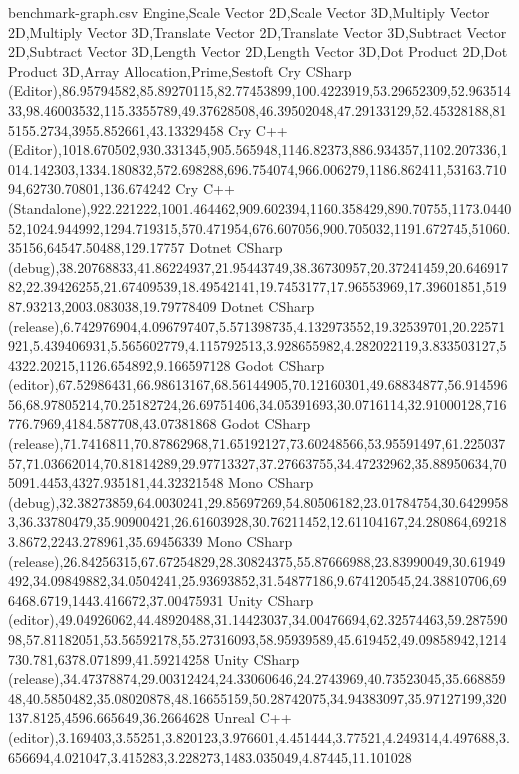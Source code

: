 \begin{filecontents*}{benchmark-graph.csv}
Engine,Scale Vector 2D,Scale Vector 3D,Multiply Vector 2D,Multiply Vector 3D,Translate Vector 2D,Translate Vector 3D,Subtract Vector 2D,Subtract Vector 3D,Length Vector 2D,Length Vector 3D,Dot Product 2D,Dot Product 3D,Array Allocation,Prime,Sestoft
Cry CSharp (Editor),86.95794582,85.89270115,82.77453899,100.4223919,53.29652309,52.96351433,98.46003532,115.3355789,49.37628508,46.39502048,47.29133129,52.45328188,815155.2734,3955.852661,43.13329458
Cry C++ (Editor),1018.670502,930.331345,905.565948,1146.82373,886.934357,1102.207336,1014.142303,1334.180832,572.698288,696.754074,966.006279,1186.862411,53163.71094,62730.70801,136.674242
Cry C++ (Standalone),922.221222,1001.464462,909.602394,1160.358429,890.70755,1173.044052,1024.944992,1294.719315,570.471954,676.607056,900.705032,1191.672745,51060.35156,64547.50488,129.17757
Dotnet CSharp (debug),38.20768833,41.86224937,21.95443749,38.36730957,20.37241459,20.64691782,22.39426255,21.67409539,18.49542141,19.7453177,17.96553969,17.39601851,51987.93213,2003.083038,19.79778409
Dotnet CSharp (release),6.742976904,4.096797407,5.571398735,4.132973552,19.32539701,20.22571921,5.439406931,5.565602779,4.115792513,3.928655982,4.282022119,3.833503127,54322.20215,1126.654892,9.166597128
Godot CSharp (editor),67.52986431,66.98613167,68.56144905,70.12160301,49.68834877,56.91459656,68.97805214,70.25182724,26.69751406,34.05391693,30.0716114,32.91000128,716776.7969,4184.587708,43.07381868
Godot CSharp (release),71.7416811,70.87862968,71.65192127,73.60248566,53.95591497,61.22503757,71.03662014,70.81814289,29.97713327,37.27663755,34.47232962,35.88950634,705091.4453,4327.935181,44.32321548
Mono CSharp (debug),32.38273859,64.0030241,29.85697269,54.80506182,23.01784754,30.64299583,36.33780479,35.90900421,26.61603928,30.76211452,12.61104167,24.280864,692183.8672,2243.278961,35.69456339
Mono CSharp (release),26.84256315,67.67254829,28.30824375,55.87666988,23.83990049,30.61949492,34.09849882,34.0504241,25.93693852,31.54877186,9.674120545,24.38810706,696468.6719,1443.416672,37.00475931
Unity CSharp (editor),49.04926062,44.48920488,31.14423037,34.00476694,62.32574463,59.28759098,57.81182051,53.56592178,55.27316093,58.95939589,45.619452,49.09858942,1214730.781,6378.071899,41.59214258
Unity CSharp (release),34.47378874,29.00312424,24.33060646,24.2743969,40.73523045,35.66885948,40.5850482,35.08020878,48.16655159,50.28742075,34.94383097,35.97127199,320137.8125,4596.665649,36.2664628
Unreal C++ (editor),3.169403,3.55251,3.820123,3.976601,4.451444,3.77521,4.249314,4.497688,3.656694,4.021047,3.415283,3.228273,1483.035049,4.87445,11.101028

\end{filecontents*}
